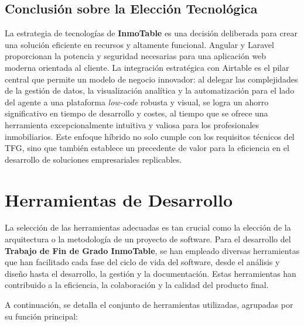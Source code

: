 \subsection{Conclusión sobre la Elección Tecnológica}    

La estrategia de tecnologías de \textbf{InmoTable} es una decisión deliberada para crear una solución eficiente en recursos y altamente funcional. Angular y Laravel proporcionan la potencia y seguridad necesarias para una aplicación web moderna orientada al cliente. La integración estratégica con Airtable es el pilar central que permite un modelo de negocio innovador: al delegar las complejidades de la gestión de datos, la visualización analítica y la automatización para el lado del agente a una plataforma \textit{low-code} robusta y visual, se logra un ahorro significativo en tiempo de desarrollo y costes, al tiempo que se ofrece una herramienta excepcionalmente intuitiva y valiosa para los profesionales inmobiliarios. Este enfoque híbrido no solo cumple con los requisitos técnicos del TFG, sino que también establece un precedente de valor para la eficiencia en el desarrollo de soluciones empresariales replicables.


\section{Herramientas de Desarrollo}

La selección de las herramientas adecuadas es tan crucial como la elección de la arquitectura o la metodología de un proyecto de software. Para el desarrollo del \textbf{Trabajo de Fin de Grado InmoTable}, se han empleado diversas herramientas que han facilitado cada fase del ciclo de vida del software, desde el análisis y diseño hasta el desarrollo, la gestión y la documentación. Estas herramientas han contribuido a la eficiencia, la colaboración y la calidad del producto final.

A continuación, se detalla el conjunto de herramientas utilizadas, agrupadas por su función principal:

